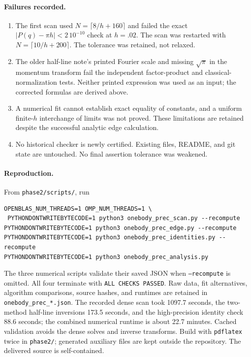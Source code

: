 \documentclass[11pt,a4paper]{article}
\begin{document}
\paragraph{Failures recorded.}
\begin{enumerate}
\item The first scan used $N=\lceil8/h+160\rceil$ and failed the exact
$|P(q)-\pi h|<2\,10^{-10}$ check at $h=.02$. The scan was restarted
with $N=\lceil10/h+200\rceil$. The tolerance was retained, not relaxed.
\item The older half-line note's printed Fourier scale and missing
$\sqrt\pi$ in the momentum transform fail the independent factor-product
and classical-normalization tests. Neither printed expression was used
as an input; the corrected formulas are derived above.
\item A numerical fit cannot establish exact equality of constants, and a
uniform finite-$h$ interchange of limits was not proved. These limitations
are retained despite the successful analytic edge calculation.
\item No historical checker is newly certified. Existing files, README,
and git state are untouched. No final assertion tolerance was weakened.
\end{enumerate}

\paragraph{Reproduction.}
From \texttt{phase2/scripts/}, run
\begin{verbatim}
OPENBLAS_NUM_THREADS=1 OMP_NUM_THREADS=1 \
 PYTHONDONTWRITEBYTECODE=1 python3 onebody_prec_scan.py --recompute
PYTHONDONTWRITEBYTECODE=1 python3 onebody_prec_edge.py --recompute
PYTHONDONTWRITEBYTECODE=1 python3 onebody_prec_identities.py --recompute
PYTHONDONTWRITEBYTECODE=1 python3 onebody_prec_analysis.py
\end{verbatim}
The three numerical scripts validate their saved JSON when \texttt{--recompute}
is omitted. All four terminate with \texttt{ALL CHECKS PASSED}.
Raw data, fit alternatives, algorithm comparisons, source hashes, and
runtimes are retained in \texttt{onebody\_prec\_*.json}.
The recorded dense scan took 1097.7 seconds, the two-method half-line inversions 173.5 seconds, and the high-precision identity check 88.6 seconds; the combined numerical runtime is about 22.7 minutes. Cached validation avoids the dense solves and inverse transforms.
Build with \texttt{pdflatex} twice in \texttt{phase2/}; generated auxiliary
files are kept outside the repository. The delivered source is self-contained.
\end{document}
